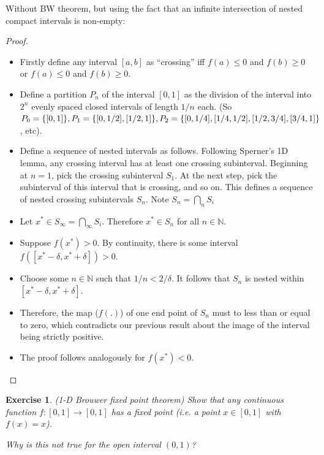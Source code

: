 \documentclass[12pt]{article}
\newtheorem{exercise}{Exercise}
\newcommand{\N}{\mathbb{N}}
\begin{document}
Without BW theorem, but using the fact that an infinite intersection of nested compact intervals is non-empty:

\begin{proof}

    \begin{itemize}
        \item Firstly define any interval $[a,b]$ as ``crossing'' iff $f(a) \leq 0$ and $f(b) \geq 0$ or $f(a) \leq 0$ and $f(b) \geq 0$.
        \item Define a partition $P_n$ of the interval $[0,1]$ as the division of the interval into $2^n$ evenly spaced closed intervals of length $1/n$ each. (So $P_0 = \{[0,1]\}, P_1 = \{[0,1/2], [1/2,1]\}, \\P_2 = \{[0,1/4],[1/4,1/2],[1/2,3/4], [3/4,1]\}$, etc).
        \item Define a sequence of nested intervals as follows. Following Sperner's 1D lemma, any crossing interval has at least one crossing subinterval. Beginning at $n=1$, pick the crossing subinterval $S_1$. At the next step, pick the subinterval of this interval that is crossing, and so on. This defines a sequence of nested crossing subintervals $S_n$. Note $S_n = \bigcap_n S_i$
        \item Let $x^* \in S_{\infty} = \bigcap_{\infty} S_i$. Therefore $x^* \in S_n$ for all $n \in \N$.
        \item Suppose $f(x^*)>0$. By continuity, there is some interval $f([x^*-\delta, x^*+\delta]) > 0$.
        \item Choose some $n \in \N$ such that $1/n < 2/\delta$. It follows that $S_n$ is nested within $[x^*-\delta, x^*+\delta]$.
        \item Therefore, the map ($f(.)$) of one end point of $S_n$ must to less than or equal to zero, which contradicts our previous result about the image of the interval being strictly positive.
        \item The proof follows analogously for $f(x^*) < 0$.
    \end{itemize}

\end{proof}

\begin{exercise}
    (1-D Brouwer fixed point theorem) Show that any continuous function $f: [0,1] \to [0,1]$ has a fixed point (i.e. a point $x \in [0,1]$ with $f(x)=x$).
    
    Why is this not true for the open interval $(0,1)$?
    
\end{exercise}
\end{document}
